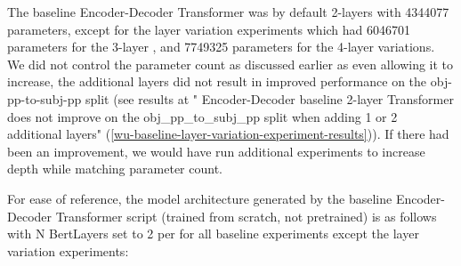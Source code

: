 \documentclass[11pt]{article}
\begin{document}
The baseline \cite{Wu2023} Encoder-Decoder Transformer was by default 2-layers with 4344077 parameters,
except for the layer variation experiments which had 6046701 parameters for the 3-layer , and 7749325 parameters for the 4-layer variations.
We did not control the parameter count as discussed earlier as even allowing it to increase, the additional layers did not result in improved performance on the obj-pp-to-subj-pp split (see results at "\cite{Wu2023} Encoder-Decoder baseline 2-layer Transformer does not improve on the obj\_pp\_to\_subj\_pp split when adding 1 or 2 additional layers" (\ref{wu-baseline-layer-variation-experiment-results})). If there had been an improvement, we would have run additional experiments to increase depth while matching parameter count.

For ease of reference, the model architecture generated by the \cite{Wu2023} baseline Encoder-Decoder Transformer script (trained from scratch, not pretrained) is as follows with N BertLayers set to 2 per \cite{Wu2023} for all baseline experiments except the layer variation experiments:
\end{document}
